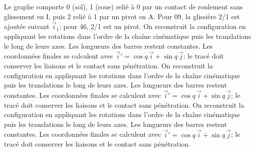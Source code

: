 \begin{corrigebox}
Le graphe comporte 0 (sol), 1 (roue) relié à 0 par
                    un contact de roulement sans glissement en I, puis 2 relié à 1 par un
                    pivot en A. Pour 09, la glissière 2/1 est ajoutée suivant $\vec i_1$;
                    pour 46, 2/1 est un pivot.
On reconstruit la configuration en appliquant les
                rotations dans l'ordre de la chaîne cinématique puis les translations le
                long de leurs axes. Les longueurs des barres restent constantes. Les
                coordonnées finales se calculent avec
                $\vec i'=\cos q\,\vec i+\sin q\,\vec j$; le tracé doit conserver les
                liaisons et le contact sans pénétration.
On reconstruit la configuration en appliquant les
                rotations dans l'ordre de la chaîne cinématique puis les translations le
                long de leurs axes. Les longueurs des barres restent constantes. Les
                coordonnées finales se calculent avec
                $\vec i'=\cos q\,\vec i+\sin q\,\vec j$; le tracé doit conserver les
                liaisons et le contact sans pénétration.
On reconstruit la configuration en appliquant les
                rotations dans l'ordre de la chaîne cinématique puis les translations le
                long de leurs axes. Les longueurs des barres restent constantes. Les
                coordonnées finales se calculent avec
                $\vec i'=\cos q\,\vec i+\sin q\,\vec j$; le tracé doit conserver les
                liaisons et le contact sans pénétration.
\end{corrigebox}
